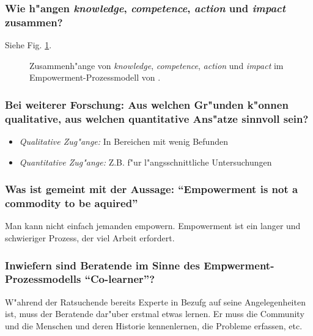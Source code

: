 \subsubsection{Wie h"angen \emph{knowledge}, \emph{competence}, \emph{action} und \emph{impact} zusammen?}
Siehe Fig. \ref{fig:cattaneo2}.
\begin{figure}[hb!]
        \begin{center}
        \end{center}
        \caption{Zusammenh"ange von \emph{knowledge}, \emph{competence}, \emph{action} und \emph{impact} im Empowerment-Prozessmodell von \textcite{cattaneo_process_2010}.}
        \label{fig:cattaneo2}
\end{figure}

\subsubsection{Bei weiterer Forschung: Aus welchen Gr"unden k"onnen qualitative, aus welchen quantitative Ans"atze sinnvoll sein?}
\begin{itemize}
        \item \emph{Qualitative Zug"ange:} In Bereichen mit wenig Befunden
        \item \emph{Quantitative Zug"ange:} Z.B. f"ur l"angsschnittliche Untersuchungen
\end{itemize}

\subsubsection{Was ist gemeint mit der Aussage: ``Empowerment is not a commodity to be aquired''}
Man kann nicht einfach jemanden empowern. Empowerment ist ein langer und schwieriger Prozess, der viel Arbeit erfordert.

\subsubsection{Inwiefern sind Beratende im Sinne des Empwerment-Prozessmodells ``Co-learner''?}
W"ahrend der Ratsuchende bereits Experte in Bezufg auf seine Angelegenheiten ist, muss der Beratende dar"uber erstmal etwas lernen. Er muss die Community und die Menschen und deren Historie kennenlernen, die Probleme erfassen, etc.

